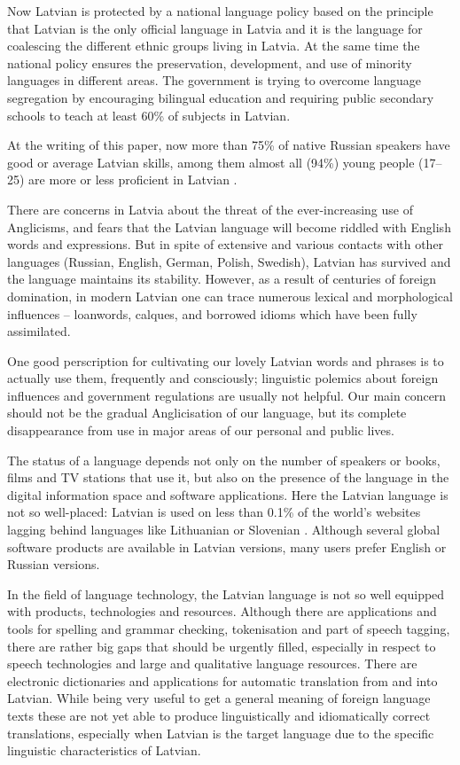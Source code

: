 \begin{multicols}{2}
Now Latvian is protected by a national language policy based on the principle that Latvian is the only official language in Latvia and it is the language for coalescing the  different ethnic groups living in Latvia.
At the same time the national policy ensures the preservation, development, and use of minority languages in different areas.
The government is trying to overcome language segregation by encouraging bilingual education and requiring public secondary schools to teach at least 60\% of subjects in Latvian. 

At the writing of this paper, now more than 75\% of native Russian speakers have good or average Latvian skills, among them almost all (94\%) young people (17--25) are more or less proficient in Latvian \cite{Meta3ES}. 

There are concerns in Latvia about the threat of the ever-increasing use of Anglicisms, and fears that the Latvian language will become riddled with English words and expressions.
But in spite of extensive and various contacts with other languages (Russian, English, German, Polish, Swedish), Latvian has survived and the language maintains its stability.
However, as a result of centuries of foreign domination, in modern Latvian one can trace numerous lexical and morphological influences -- loanwords, calques, and borrowed idioms which have been fully assimilated. 

One good perscription for cultivating our lovely Latvian words and phrases is to actually use them, frequently and consciously; linguistic polemics about foreign influences and government regulations are usually not helpful.  Our main concern should not be the gradual Anglicisation of our language, but its complete disappearance from use in major areas of our personal and public lives.
 
The status of a language depends not only on the number of speakers or books, films and TV stations that use it, but also on the presence of the language in the digital information space and software applications.
Here the Latvian language is not so well-placed: Latvian is used on less than 0.1\% of the world’s websites lagging behind languages like Lithuanian or Slovenian \cite{Meta4ES}.
Although several global software products are available in Latvian versions, many users prefer English or Russian versions.  

In the field of language technology, the Latvian language is not so well equipped with products, technologies and resources.
Although there are applications and tools for spelling and grammar checking, tokenisation and part of speech tagging, there are rather big gaps that should be urgently filled, especially in respect to speech technologies and large and qualitative language resources.
There are electronic dictionaries and applications for automatic translation from and into Latvian.
While being very useful to get a general meaning of foreign language texts these are not yet able to produce linguistically and idiomatically correct translations, especially when Latvian is the target language due to the specific linguistic characteristics of Latvian.


\end{multicols}
